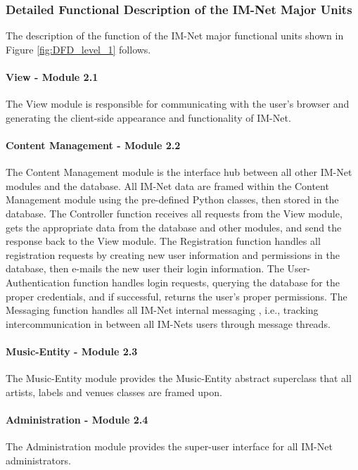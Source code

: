 \documentclass[letterpaper,12pt]{article}
\begin{document}
{\textcolor{subsubsection}{\subsubsection{Detailed Functional Description of the IM-Net Major Units}}

The description of the function of the IM-Net major functional units shown in Figure \ref{fig:DFD_level_1} follows.

\paragraph{View - Module 2.1}
The View module is responsible for communicating with the user's browser and generating the client-side appearance and functionality of IM-Net.

\paragraph{Content Management - Module 2.2}
The Content Management module is the interface hub between all other IM-Net modules and the database. All IM-Net data are framed within the Content Management module using the pre-defined Python classes, then stored in the database. The Controller function receives all requests from the View module, gets the appropriate data from the database and other modules, and send the response back to the View module. The Registration function handles all registration requests by creating new user information and permissions in the database, then e-mails the new user their login information. The User-Authentication function handles login requests, querying the database for the proper credentials, and if successful, returns the user's proper permissions. The Messaging function handles all IM-Net internal messaging , i.e., tracking intercommunication in between all IM-Nets users through message threads.

\paragraph{Music-Entity - Module 2.3}
The Music-Entity module provides the Music-Entity abstract superclass that all artists, labels and venues classes are framed upon.

\paragraph{Administration - Module 2.4}
The Administration module provides the super-user interface for all IM-Net administrators.

}
\end{document}
